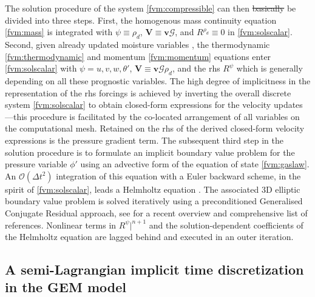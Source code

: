\documentclass[gmd, manuscript]{copernicus}
\newcommand{\scs}[1]{{\scriptstyle #1}}
\providecommand{\DIFdel}[1]{{\protect\color{red}\sout{#1}}}                      %
\providecommand{\DIFdelbegin}{} %
\providecommand{\DIFdelend}{} %
\begin{document}
The solution procedure of the system \eqref{fvm:compressible} can then \DIFdelbegin \DIFdel{basically }\DIFdelend be divided into three steps. First, the homogenous
mass continuity equation \eqref{fvm:mass} is integrated with $\psi \equiv \rho_d$, $\mathbf{V} \equiv \mathbf{v}\mathcal{G} $,
and $R^{\rho_d} \equiv 0$ in \eqref{fvm:solscalar}. Second, given already updated moisture variables 
\citep{smolarkiewiczetalJCP2017}, the thermodynamic \eqref{fvm:thermodynamic} and momentum \eqref{fvm:momentum} equations enter
\eqref{fvm:solscalar} with $\psi = u, v, w, \theta'$, $\mathbf{V} \equiv \mathbf{v}\mathcal{G}\rho_d$, and the rhs $R^{\psi}$ 
which is generally depending on all these prognostic variables. The high degree of implicitness in the representation of the rhs forcings
is achieved by inverting the overall discrete system \eqref{fvm:solscalar} to obtain closed-form expressions for the
velocity updates---this procedure is facilitated by the co-located arrangement of all variables on the computational mesh.
Retained on the rhs of the derived closed-form velocity expressions is the pressure gradient term.
The subsequent third step in the solution procedure is to formulate an implicit boundary value problem for the pressure variable $\phi'$ using 
an advective form of the equation of state \eqref{fvm:gaslaw}. An $\mathcal{O}(\Delta t^2)$ integration of this 
equation with a Euler backward scheme, in the spirit of \eqref{fvm:solscalar}, leads a Helmholtz equation
\citep{smolarkiewiczJCP2014}.
The associated 3D elliptic boundary value problem is solved iteratively using a preconditioned Generalised Conjugate 
Residual approach, see \cite{smolarkiewiczAG2011} for a recent overview and comprehensive list of references.
Nonlinear terms in $R^{\psi}|^{\scs n+1}$ and the 
solution-dependent coefficients of the Helmholtz equation are lagged behind and executed in an outer iteration.


\subsection {A semi-Lagrangian implicit time discretization in the GEM model} \label{sec:GEM_temporal}
\end{document}
